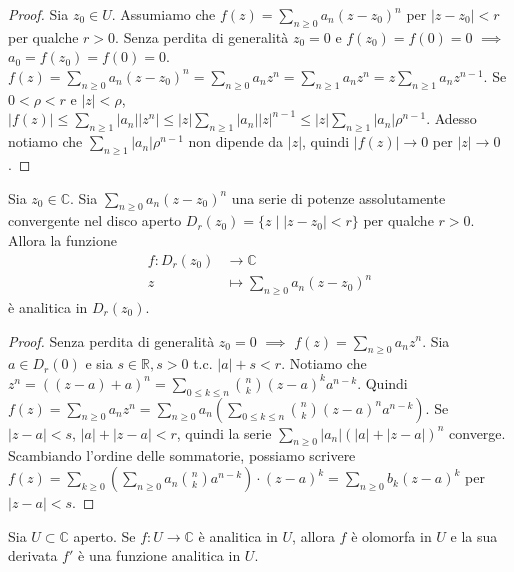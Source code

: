 \begin{proof}
  Sia $z_0 \in U$. Assumiamo che $\displaystyle f(z)=\sum_{n \ge 0}a_n(z-z_0)^n$ per $|z-z_0|<r$ per qualche $r>0$. Senza perdita di generalità $z_0=0$ e $f(z_0)=f(0)=0$ $\implies$ $a_0=f(z_0)=f(0)=0$.
  $\displaystyle f(z)=\sum_{n \ge 0} a_n(z-z_0)^n=\sum_{n \ge 0} a_nz^n=\sum_{n \ge 1} a_nz^n=z\sum_{n \ge 1} a_nz^{n-1}$. Se $0<\rho<r$ e $|z|<\rho$, $\displaystyle |f(z)| \le \sum_{n \ge 1} |a_n||z^n| \le |z| \sum_{n \ge 1} |a_n||z|^{n-1} \le |z| \sum_{n \ge 1} |a_n| \rho^{n-1}$.
  Adesso notiamo che $\displaystyle \sum_{n \ge 1} |a_n| \rho^{n-1}$ non dipende da $|z|$, quindi $|f(z)| \longrightarrow 0$ per $|z| \longrightarrow 0$.
\end{proof}

\begin{prop}
  Sia $z_0 \in \mathbb{C}$. Sia $\displaystyle \sum_{n \ge 0} a_n(z-z_0)^n$ una serie di potenze assolutamente convergente nel disco aperto $D_r(z_0)=\{z \mid |z-z_0|<r\}$ per qualche $r>0$. Allora la funzione
  \begin{align*}
    f:D_r(z_0) &\longrightarrow \mathbb{C}\\
    z &\longmapsto \sum_{n \ge 0} a_n(z-z_0)^n
  \end{align*}
  è analitica in $D_r(z_0)$.
\end{prop}

\begin{proof}
  Senza perdita di generalità $z_0=0$ $\implies$ $\displaystyle f(z)=\sum_{n \ge 0} a_nz^n$. Sia $a \in D_r(0)$ e sia $s \in \mathbb{R}, s>0$ t.c. $|a|+s<r$. Notiamo che $\displaystyle z^n=((z-a)+a)^n=\displaystyle \sum_{0 \le k \le n} \binom{n}{k}(z-a)^ka^{n-k}$.
  Quindi $\displaystyle f(z)=\sum_{n \ge 0} a_nz^n=\sum_{n \ge 0} a_n\left(\sum_{0 \le k \le n} \binom{n}{k}(z-a)^na^{n-k}\right)$. Se $|z-a|<s$, $|a|+|z-a|<r$, quindi la serie $\displaystyle \sum_{n \ge 0} |a_n|(|a|+|z-a|)^n$ converge.
  Scambiando l'ordine delle sommatorie, possiamo scrivere $\displaystyle f(z)=\sum_{k \ge 0} \left(\sum_{n \ge 0} a_n\binom{n}{k}a^{n-k}\right)\cdot (z-a)^k=\sum_{n \ge 0}b_k(z-a)^k$ per $|z-a|<s$.
\end{proof}

\begin{thm}
  Sia $U \subset \mathbb{C}$ aperto. Se $f:U \longrightarrow \mathbb{C}$ è analitica in $U$, allora $f$ è olomorfa in $U$ e la sua derivata $f'$ è una funzione analitica in $U$.
\end{thm}

